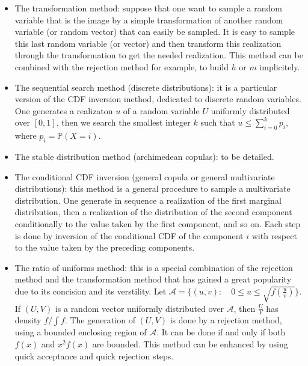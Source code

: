 {\begin{itemize}
  \item The transformation method: suppose that one want to sample a random variable that is the image by a simple transformation of another random variable (or random vector) that can easily be sampled. It is easy to sample this last random variable (or vector) and then transform this realization through the transformation to get the needed realization. This method can be combined with the rejection method for example, to build $h$ or $m$ implicitely.
  \item The sequential search method (discrete distributions): it is a particular version of the CDF inversion method, dedicated to discrete random variables. One generates a realizaton $u$ of a random variable $U$ uniformly distributed over $[0, 1]$, then we search the smallest integer $k$ such that $u\leq\sum_{i=0}^kp_i$, where $p_i=\mathbb{P}(X=i)$.
  \item The stable distribution method (archimedean copulas): to be detailed.
  \item The conditional CDF inversion (general copula or general multivariate distributions): this method is a general procedure to sample a multivariate distribution. One generate in sequence a realization of the first marginal distribution, then a realization of the distribution of the second component conditionally to the value taken by the first component, and so on. Each step is done by inversion of the conditional CDF of the component $i$ with respect to the value taken by the preceding components.
  \item The ratio of uniforms method: this is a special combination of the rejection method and the transformation method that has gained a great popularity due to its concision and its verstility. Let $\mathcal{A}=\{(u,v):\quad 0\leq u\leq \sqrt{f\left(\frac{u}{v}\right)}\}$. If $(U,V)$ is a random vector uniformly distributed over $\mathcal{A}$, then $\frac{U}{V}$ has density $f/\int f$. The generation of $(U, V)$ is done by a rejection method, using a bounded enclosing region of $\mathcal{A}$. It can be done if and only if both $f(x)$ and $x^2f(x)$ are bounded. This method can be enhanced by using quick acceptance and quick rejection steps.

\end{itemize}}
